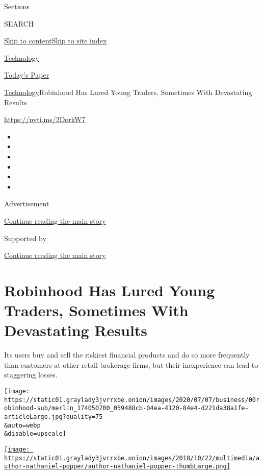 Sections

SEARCH

\protect\hyperlink{site-content}{Skip to
content}\protect\hyperlink{site-index}{Skip to site index}

\href{https://www.nytimes3xbfgragh.onion/section/technology}{Technology}

\href{https://myaccount.nytimes3xbfgragh.onion/auth/login?response_type=cookie\&client_id=vi}{}

\href{https://www.nytimes3xbfgragh.onion/section/todayspaper}{Today's
Paper}

\href{/section/technology}{Technology}\textbar{}Robinhood Has Lured
Young Traders, Sometimes With Devastating Results

\href{https://nyti.ms/2DorkW7}{https://nyti.ms/2DorkW7}

\begin{itemize}
\item
\item
\item
\item
\item
\item
\end{itemize}

Advertisement

\protect\hyperlink{after-top}{Continue reading the main story}

Supported by

\protect\hyperlink{after-sponsor}{Continue reading the main story}

\hypertarget{robinhood-has-lured-young-traders-sometimes-with-devastating-results}{%
\section{Robinhood Has Lured Young Traders, Sometimes With Devastating
Results}\label{robinhood-has-lured-young-traders-sometimes-with-devastating-results}}

Its users buy and sell the riskiest financial products and do so more
frequently than customers at other retail brokerage firms, but their
inexperience can lead to staggering losses.

\texttt{[image: https://static01.graylady3jvrrxbe.onion/images/2020/07/07/business/00robinhood-sub/merlin\_174050700\_059488cb-04ea-4120-84e4-d221da38a1fe-articleLarge.jpg?quality=75\\\&auto=webp\\\&disable=upscale]}

\href{https://www.nytimes3xbfgragh.onion/by/nathaniel-popper}{\texttt{[image: https://static01.graylady3jvrrxbe.onion/images/2018/10/22/multimedia/author-nathaniel-popper/author-nathaniel-popper-thumbLarge.png]}}

